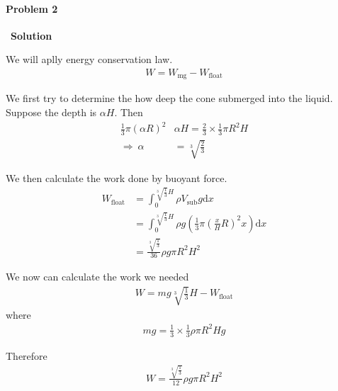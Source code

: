 \documentclass[12pt,a4paper]{article}
\begin{document}
\paragraph{\large \textbf{Problem 2}}~{\textbf{Solution}}
\vspace{2mm}
\par We will aplly energy conservation law.
\begin{align}
	W = W_{\text{mg}} - W_{\text{float}}
\end{align}
\par We first try to determine the how deep the cone submerged into the liquid. Suppose the depth is $\alpha H$. Then
\begin{align}
	\frac{1}{3}\pi(\alpha R)^2 &\alpha H = \frac{2}{3} \times \frac{1}{3}\pi R^2H\\
	\Rightarrow\ \alpha &= \sqrt[3]{\frac{2}{3}}
\end{align}
\par We then calculate the work done by buoyant force.
\begin{align}
	W_{\text{float}} &= \int_0^{\sqrt[3]{\frac{1}{3}}H} \rho V_{\text{sub}} g \text{d}x\\
	&= \int_0^{\sqrt[3]{\frac{1}{3}}H} \rho g \left( \frac{1}{3} \pi \left( \frac{x}{H}R \right)^2 x \right) \text{d}x\\
	&= \frac{\sqrt[3]{\frac{1}{3}}}{36} \rho g \pi R^2H^2 
\end{align}
\par We now can calculate the work we needed
\begin{align}
	W = mg\sqrt[3]{\frac{1}{3}}H - W_{\text{float}}
\end{align}
\noindent where
\begin{align}
	mg = \frac{1}{3}\times \frac{1}{3} \rho \pi R^2H g
\end{align}
\par Therefore
\begin{align}
	W = \frac{\sqrt[3]{\frac{1}{3}}}{12} \rho g \pi R^2H^2 
\end{align}
\end{document}
